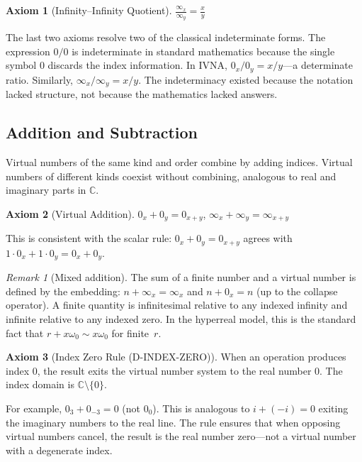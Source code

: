 \documentclass[12pt]{article}
\theoremstyle{definition}
\newtheorem{axiom}{Axiom}
\theoremstyle{remark}
\newtheorem{remark}[theorem]{Remark}
\newcommand{\vz}[1]{0_{#1}}             %
\newcommand{\vi}[1]{\infty_{#1}}        %
\newcommand{\C}{\mathbb{C}}
\begin{document}
\begin{axiom}[Infinity--Infinity Quotient]
\label{ax:iidiv}
$\displaystyle\frac{\vi{x}}{\vi{y}} = \frac{x}{y}$
\end{axiom}

The last two axioms resolve two of the classical indeterminate forms.
The expression $0/0$ is indeterminate in standard mathematics because
the single symbol $0$ discards the index information. In IVNA,
$\vz{x}/\vz{y} = x/y$---a determinate ratio. Similarly,
$\vi{x}/\vi{y} = x/y$. The indeterminacy existed because the notation
lacked structure, not because the mathematics lacked answers.

\subsection{Addition and Subtraction}

Virtual numbers of the same kind and order combine by adding indices.
Virtual numbers of different kinds coexist without combining, analogous
to real and imaginary parts in $\mathbb{C}$.

\begin{axiom}[Virtual Addition]
\label{ax:add}
$\vz{x} + \vz{y} = \vz{x+y}$, \quad $\vi{x} + \vi{y} = \vi{x+y}$
\end{axiom}

This is consistent with the scalar rule: $\vz{x} + \vz{y} = \vz{x+y}$
agrees with $1 \cdot \vz{x} + 1 \cdot \vz{y} = \vz{x} + \vz{y}$.

\begin{remark}[Mixed addition]
The sum of a finite number and a virtual number is defined by the
embedding: $n + \vi{x} = \vi{x}$ and $n + \vz{x} = n$ (up to the
collapse operator). A finite quantity is infinitesimal relative to any
indexed infinity and infinite relative to any indexed zero. In the
hyperreal model, this is the standard fact that $r + x\omega_0 \sim
x\omega_0$ for finite~$r$.
\end{remark}

\begin{axiom}[Index Zero Rule (D-INDEX-ZERO)]
\label{ax:indexzero}
When an operation produces index $0$, the result exits the virtual number
system to the real number $0$. The index domain is $\C \setminus \{0\}$.
\end{axiom}

For example, $\vz{3} + \vz{-3} = 0$ (not $\vz{0}$). This is
analogous to $i + (-i) = 0$ exiting the imaginary numbers to the
real line. The rule ensures that when opposing virtual numbers cancel,
the result is the real number zero---not a virtual number with a
degenerate index.
\end{document}

